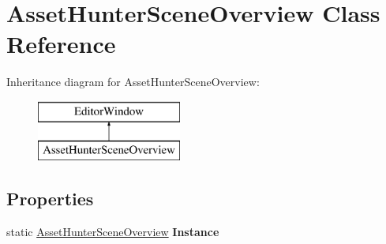 \hypertarget{class_asset_hunter_scene_overview}{}\section{Asset\+Hunter\+Scene\+Overview Class Reference}
\label{class_asset_hunter_scene_overview}
Inheritance diagram for Asset\+Hunter\+Scene\+Overview\+:\begin{figure}[H]
\begin{center}
\leavevmode
\includegraphics[height=2.000000cm]{class_asset_hunter_scene_overview}
\end{center}
\end{figure}
\subsection*{Properties}
\begin{DoxyCompactItemize}
\item 
\mbox{\label{class_asset_hunter_scene_overview_a759df066271904285596adc4da3d5602}} 
static \hyperlink{class_asset_hunter_scene_overview}{Asset\+Hunter\+Scene\+Overview} {\bfseries Instance}
\end{DoxyCompactItemize}
